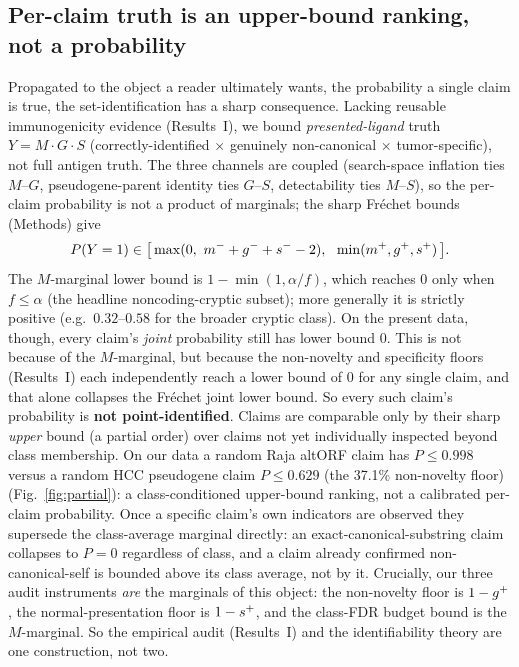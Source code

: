 \subsection{Per-claim truth is an upper-bound ranking, not a probability}
Propagated to the object a reader ultimately wants, the probability a single claim is true, the set-identification has a sharp consequence. Lacking reusable immunogenicity evidence (Results~I), we bound \emph{presented-ligand} truth $Y = M\cdot G\cdot S$ (correctly-identified $\times$ genuinely non-canonical $\times$ tumor-specific), not full antigen truth. The three channels are coupled (search-space inflation ties $M$--$G$, pseudogene-parent identity ties $G$--$S$, detectability ties $M$--$S$), so the per-claim probability is not a product of marginals; the sharp Fr\'echet bounds (Methods) give
\begin{equation}
P(Y=1)\in\bigl[\,\max(0,\ \Mlo+\Glo+\Slo-2),\ \ \min(\Mhi,\Ghi,\Shi)\,\bigr].
\label{eq:frechet}
\end{equation}
The $M$-marginal lower bound is $1-\min(1,\alpha/f)$, which reaches $0$ only when $f\le\alpha$ (the headline noncoding-cryptic subset); more generally it is strictly positive (e.g.\ $0.32$--$0.58$ for the broader cryptic class). On the present data, though, every claim's \emph{joint} probability still has lower bound $0$. This is not because of the $M$-marginal, but because the non-novelty and specificity floors (Results~I) each independently reach a lower bound of $0$ for any single claim, and that alone collapses the Fr\'echet joint lower bound. So every such claim's probability is \textbf{not point-identified}. Claims are comparable only by their sharp \emph{upper} bound (a partial order) over claims not yet individually inspected beyond class membership. On our data a random Raja altORF claim has $P \le 0.998$ versus a random HCC pseudogene claim $P \le 0.629$ (the 37.1\% non-novelty floor) (Fig.~\ref{fig:partial}): a class-conditioned upper-bound ranking, not a calibrated per-claim probability. Once a specific claim's own indicators are observed they supersede the class-average marginal directly: an exact-canonical-substring claim collapses to $P = 0$ regardless of class, and a claim already confirmed non-canonical-self is bounded above its class average, not by it. Crucially, our three audit instruments \emph{are} the marginals of this object: the non-novelty floor is $1-g^{+}$, the normal-presentation floor is $1-s^{+}$, and the class-FDR budget bound is the $M$-marginal. So the empirical audit (Results~I) and the identifiability theory are one construction, not two.

